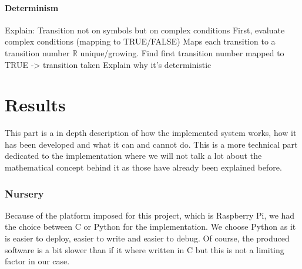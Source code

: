 \documentclass[12pt]{article}
\theoremstyle{definition}
\theoremstyle{definition}
\newcommand{\R}{\mathbb{R}}
\begin{document}
\subsection{Determinism}

Explain: Transition not on symbols but on complex conditions
First, evaluate complex conditions (mapping to TRUE/FALSE)
Maps each transition to a transition number $\R$ unique/growing.
Find first transition number mapped to TRUE -> transition taken
Explain why it's deterministic





























\clearpage
\part{Results}

This part is a in depth description of how the implemented system works, how it has been developed and what it can and cannot do. This is a more technical part dedicated to the implementation where we will not talk a lot about the mathematical concept behind it as those have already been explained before.\\

\clearpage
\section{Nursery}

Because of the platform imposed for this project, which is Raspberry Pi, we had the choice between C or Python for the implementation. We choose Python as it is easier to deploy, easier to write and easier to debug. Of course, the produced software is a bit slower than if it where written in C but this is not a limiting factor in our case.
\end{document}
